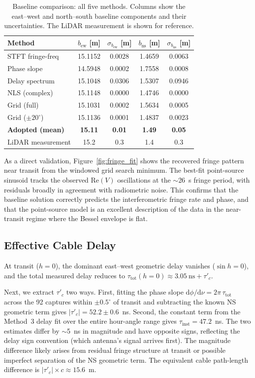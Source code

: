 \documentclass[10pt,preprint2]{aastex}
\begin{document}
\begin{table}[b!]
\centering
\caption{Baseline comparison: all five methods. Columns show the east--west and north--south baseline components and their uncertainties. The LiDAR measurement is shown for reference.}
\label{tab:baseline_comparison}
\begin{tabular}{lcccc}
\toprule
Method & $b_{\mathrm{ew}}$ [m] & $\sigma_{b_\mathrm{ew}}$ [m] & $b_{\mathrm{ns}}$ [m] & $\sigma_{b_\mathrm{ns}}$ [m] \\
\midrule
STFT fringe-freq & 15.1152 & 0.0028 & 1.4659 & 0.0063 \\
Phase slope & 14.5948 & 0.0002 & 1.7558 & 0.0008 \\
Delay spectrum & 15.1048 & 0.0306 & 1.5307 & 0.0946 \\
NLS (complex) & 15.1148 & 0.0000 & 1.4746 & 0.0000 \\
Grid (full) & 15.1031 & 0.0002 & 1.5634 & 0.0005 \\
Grid ($\pm 20^\circ$) & 15.1136 & 0.0001 & 1.4837 & 0.0023 \\
\midrule
\textbf{Adopted (mean)} & \textbf{15.11} & \textbf{0.01} & \textbf{1.49} & \textbf{0.05} \\
\midrule
LiDAR measurement & 15.2 & 0.3 & 1.4 & 0.3 \\
\bottomrule
\end{tabular}
\end{table}

As a direct validation, Figure~\ref{fig:fringe_fit} shows the recovered fringe pattern near transit from the windowed grid search minimum. The best-fit point-source sinusoid tracks the observed Re$(V)$ oscillations at the $\sim$26~s fringe period, with residuals broadly in agreement with radiometric noise. This confirms that the baseline solution correctly predicts the interferometric fringe rate and phase, and that the point-source model is an excellent description of the data in the near-transit regime where the Bessel envelope is flat.


\subsection{Effective Cable Delay}
\label{sec:cable_delay}

At transit ($h = 0$), the dominant east--west geometric delay vanishes ($\sin h = 0$), and the total measured delay reduces to $\tau_{\mathrm{tot}}(h=0) \approx 3.05~\mathrm{ns} + \tau'_c$.

Next, we extract $\tau'_c$ two ways. First, fitting the phase slope $\mathrm{d}\phi/\mathrm{d}\nu = 2\pi\,\tau_{\mathrm{tot}}$ across the 92 captures within $\pm 0.5^\circ$ of transit and subtracting the known NS geometric term gives $|\tau'_c| = 52.2 \pm 0.6$~ns. Second, the constant term from the Method~3 delay fit over the entire hour-angle range gives $\tau_{\mathrm{inst}} = 47.2$~ns.
The two estimates differ by $\sim$5~ns in magnitude and have opposite signs, reflecting the delay sign convention (which antenna's signal arrives first). The magnitude difference likely arises from residual fringe structure at transit or possible imperfect separation of the NS geometric term. The equivalent cable path-length difference is $|\tau'_c| \times c \approx 15.6$~m.
\end{document}
